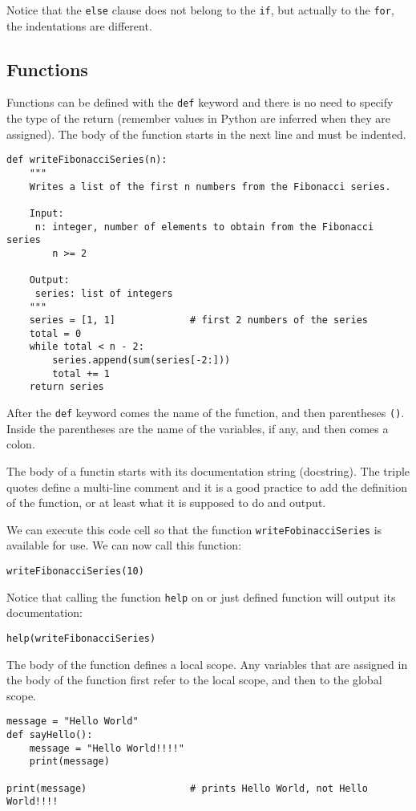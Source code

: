 \documentclass[12pt, a4paper]{article}
\begin{document}
Notice that the \texttt{else} clause does not belong to the \texttt{if}, but actually to the \texttt{for}, the indentations are different.
\subsection{Functions}
\label{sec:org8cc4c47}
Functions can be defined with the \texttt{def} keyword and there is no need to specify the type of the return (remember values in Python are inferred when they are assigned).
The body of the function starts in the next line and must be indented.
\lstset{language=jupyter-python,label= ,caption= ,captionpos=b,numbers=none}
\begin{lstlisting}
def writeFibonacciSeries(n):
    """
    Writes a list of the first n numbers from the Fibonacci series.

    Input:
     n: integer, number of elements to obtain from the Fibonacci series
        n >= 2

    Output:
     series: list of integers
    """
    series = [1, 1]             # first 2 numbers of the series
    total = 0
    while total < n - 2:
        series.append(sum(series[-2:]))
        total += 1
    return series
\end{lstlisting}
After the \texttt{def} keyword comes the name of the function, and then parentheses \texttt{()}. Inside the parentheses are the name of the variables, if any, and then comes a colon.

The body of a functin starts with its documentation string (docstring). The triple quotes define a multi-line comment and it is a good practice to add the definition of the function, or at least what it is supposed to do and output.

We can execute this code cell so that the function \texttt{writeFobinacciSeries} is available for use.
We can now call this function:
\lstset{language=jupyter-python,label= ,caption= ,captionpos=b,numbers=none}
\begin{lstlisting}
writeFibonacciSeries(10)
\end{lstlisting}

Notice that calling the function \texttt{help} on or just defined function will output its documentation:
\lstset{language=jupyter-python,label= ,caption= ,captionpos=b,numbers=none}
\begin{lstlisting}
help(writeFibonacciSeries)
\end{lstlisting}

The body of the function defines a local scope.
Any variables that are assigned in the body of the function first refer to the local scope, and then to the global scope.
\lstset{language=jupyter-python,label= ,caption= ,captionpos=b,numbers=none}
\begin{lstlisting}
message = "Hello World"
def sayHello():
    message = "Hello World!!!!"
    print(message)

print(message)                  # prints Hello World, not Hello World!!!!
\end{lstlisting}
\end{document}
